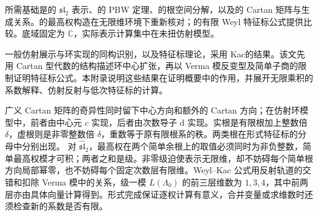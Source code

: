 \ProseParagraphBreak
所需基础是的 \(\mathfrak{sl}_2\) 表示、的 PBW 定理、的根空间分解，以及的 Cartan 矩阵与生成关系。的最高权构造在无限维环境下重新核对；的有限 Weyl 特征标公式提供比较。底域固定为 \(\mathbb C\)，实际表示计算集中在未扭仿射模型。

\ProseParagraphBreak
一般仿射展示与环实现的同构识别，以及特征标理论，采用 Kac\cite[Section 2, pp. 300--301]{Kac1980HighestWeight}的结果。该文先用 Cartan 型代数的结构描述环中心扩张，再以 Verma 模反变型及简单子商的限制证明特征标公式。本附录说明这些结果在证明概要中的作用，并展开无限乘积的系数解释、仿射反射与低次特征标的计算。






\begin{chaptersummary}
	广义 Cartan 矩阵的奇异性同时留下中心方向和额外的 Cartan 方向；在仿射环模型中，前者由中心元 \(c\) 实现，后者由次数导子 \(\mathrm d\) 实现。实根是有限根加上整数倍 \(\delta\)，虚根则是非零整数倍 \(\delta\)，重数等于原有限根系的秩。两类根在形式特征标的分母中分别出现。
	\ProseParagraphBreak
	对 \(\widehat{\mathfrak{sl}}_2\)，最高权在两个简单余根上的取值必须同时为非负整数，简单最高权模才可积；两者之和是级。非零级迫使表示无限维，却不妨碍每个简单根方向局部幂零，也不妨碍每个固定次数层有限维。Weyl–Kac 公式用反射轨道的交错和扣除 Verma 模中的关系，级一模 \(L(\Lambda_0)\) 的前三层维数为 \(1,3,4\)，其中前两层亦由具体向量计算得到。形式完成保证逐权计算有意义，合并变量或求维数时还须检查新的系数是否有限。
\end{chaptersummary}

\BookExercises


